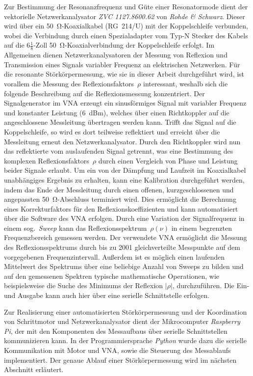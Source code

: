 Zur Bestimmung der Resonanzfrequenz und Güte einer Resonatormode dient der vektorielle Netzwerkanalysator \textit{ZVC 1127.8600.62} von \textit{Rohde \& Schwarz}.
Dieser wird über ein \SI{50}{\ohm}-Koaxialkabel (RG~214/U) mit der Koppelschleife verbunden, wobei die Verbindung durch einen Spezialadapter vom Typ-N Stecker des Kabels auf die $6\tfrac{1}{8}$-Zoll \SI{50}{\ohm}-Koaxialverbindung der Koppelschleife erfolgt.
Im Allgemeinen dienen Netzwerkanalysatoren der Messung von Reflexion und Transmission eines Signals variabler Frequenz an elektrischen Netzwerken.
Für die resonante Störkörpermessung, wie sie in dieser Arbeit durchgeführt wird, ist vorallem die Messung des Reflexionsfaktors~$\rho$ interessant, weshalb sich die folgende Beschreibung auf die Reflexionsmessung konzentriert.
Der Signalgenerator im VNA erzeugt ein sinusförmiges Signal mit variabler Frequenz und konstanter Leistung (\SI{6}{dBm}), welches über einen Richtkoppler auf die angeschlossene Messleitung übertragen werden kann.
Trifft das Signal auf die Koppelschleife, so wird es dort teilweise reflektiert und erreicht über die Messleitung erneut den Netzwerkanalysator.
Durch den Richtkoppler wird nun das reflektierte vom auslaufenden Signal getrennt, was eine Bestimmung des komplexen Reflexionsfaktors~$\rho$ durch einen Vergleich von Phase und Leistung beider Signale erlaubt.
Um ein von der Dämpfung und Laufzeit im Koaxialkabel unabhängiges Ergebnis zu erhalten, kann eine Kalibration durchgeführt werden, indem das Ende der Messleitung durch einen offenen, kurzgeschlossenen und angepassten \SI{50}{\ohm}-Abschluss terminiert wird.
Dies ermöglicht die Berechnung eines Korrekturfaktors für den Reflexionskoeffizienten und kann automatisiert über die Software des VNA erfolgen.
Durch eine Variation der Signalfrequenz in einem sog.\ \textit{Sweep} kann das Reflexionsspektrum~$\rho(\nu)$ in einem begrenzten Frequenzbereich gemessen werden.
Der verwendete VNA ermöglicht die Messung des Reflexionsspektrums durch bis zu 2001 gleichverteilte Messpunkte auf dem vorgegebenen Frequenzintervall.
Außerdem ist es möglich einen laufenden Mittelwert des Spektrums über eine beliebige Anzahl von Sweeps zu bilden und auf den gemessenen Spektren typische mathematische Operationen, wie beispielsweise die Suche des Minimums der Reflexion $|\rho|$, durchzuführen.
Die Ein- und Ausgabe kann auch hier über eine serielle Schnittstelle erfolgen.

Zur Realisierung einer automatisierten Störkörpermessung und der Koordination von Schrittmotor und Netzwerkanalysator dient der Mikrocomputer \textit{Raspberry Pi}, der mit den Komponenten des Messaufbaus über serielle Schnittstellen kommunizieren kann.
In der Programmiersprache \textit{Python} wurde dazu die serielle Kommunikation mit Motor und VNA, sowie die Steuerung des Messablaufs implementiert.
Der genaue Ablauf einer Störkörpermessung wird im nächsten Abschnitt erläutert.


